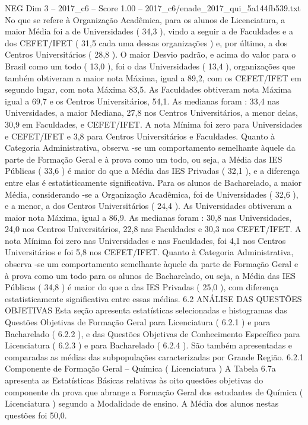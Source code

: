 \begin{textsample}{NEG Dim 3 – 2017\_c6 – Score 1.00 – 2017\_c6/enade\_2017\_qui\_5a144fb539.txt}
No que se refere à Organização Acadêmica, para os alunos de Licenciatura, a maior Média foi a de Universidades ( 34,3 ), vindo a seguir a de Faculdades e a dos CEFET/IFET ( 31,5 cada uma dessas organizações ) e, por último, a dos Centros Universitários ( 28,8 ).
O maior Desvio padrão, e acima do valor para o Brasil como um todo ( 13,0 ), foi o das Universidades ( 13,4 ), organizações que também obtiveram a maior nota Máxima, igual a 89,2, com os CEFET/IFET em segundo lugar, com nota Máxima 83,5.
As Faculdades obtiveram nota Máxima igual a 69,7 e os Centros Universitários, 54,1.
As medianas foram : 33,4 nas Universidades, a maior Mediana, 27,8 nos Centros Universitários, a menor delas, 30,9 em Faculdades, e CEFET/IFET.
A nota Mínima foi zero para Universidades e CEFET/IFET e 3,8 para Centros Universitários e Faculdades.
Quanto à Categoria Administrativa, observa -se um comportamento semelhante àquele da parte de Formação Geral e à prova como um todo, ou seja, a Média das IES Públicas ( 33,6 ) é maior do que a Média das IES Privadas ( 32,1 ), e a diferença entre elas é estatisticamente significativa.
Para os alunos de Bacharelado, a maior Média, considerando -se a Organização Acadêmica, foi de Universidades ( 32,6 ), e a menor, a dos Centros Universitários ( 24,4 ).
As Universidades obtiveram a maior nota Máxima, igual a 86,9.
As medianas foram : 30,8 nas Universidades, 24,0 nos Centros Universitários, 22,8 nas Faculdades e 30,3 nos CEFET/IFET.
A nota Mínima foi zero nas Universidades e nas Faculdades, foi 4,1 nos Centros Universitários e foi 5,8 nos CEFET/IFET.
Quanto à Categoria Administrativa, observa -se um comportamento semelhante àquele da parte de Formação Geral e à prova como um todo para os alunos de Bacharelado, ou seja, a Média das IES Públicas ( 34,8 ) é maior do que a das IES Privadas ( 25,0 ), com diferença estatisticamente significativa entre essas médias. 6.2 ANÁLISE DAS QUESTÕES OBJETIVAS Esta seção apresenta estatísticas selecionadas e histogramas das Questões Objetivas de Formação Geral para Licenciatura ( 6.2.1 ) e para Bacharelado ( 6.2.2 ), e das Questões Objetivas de Conhecimento Específico para Licenciatura ( 6.2.3 ) e para Bacharelado ( 6.2.4 ).
São também apresentadas e comparadas as médias das subpopulações caracterizadas por Grande Região. 6.2.1 Componente de Formação Geral – Química ( Licenciatura ) A Tabela 6.7a apresenta as Estatísticas Básicas relativas às oito questões objetivas do componente da prova que abrange a Formação Geral dos estudantes de Química ( Licenciatura ) segundo a Modalidade de ensino.
A Média dos alunos nestas questões foi 50,0.

\end{textsample}
